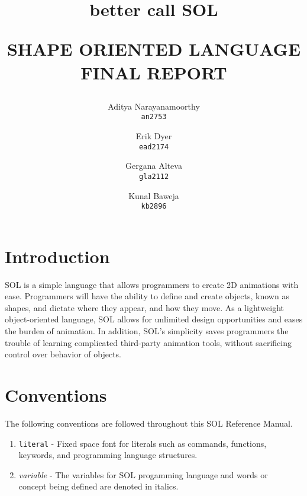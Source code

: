 \documentclass[letterpaper,12pt]{article}
\begin{document}

\title{{\small better call} {\Huge \textbf{SOL}}\\
    \begin{center}{SHAPE ORIENTED LANGUAGE FINAL REPORT}\end{center}
}

\author{Aditya Narayanamoorthy\\
    \texttt{an2753}
    \and
    Erik Dyer\\
    \texttt{ead2174}
    \and
    Gergana Alteva\\
    \texttt{gla2112}
    \and
    Kunal Baweja\\
    \texttt{kb2896}}

\maketitle

\tableofcontents

\section{Introduction}
SOL is a simple language that allows programmers to create 2D animations with ease. Programmers will have the ability to define and create objects, known as shapes, and dictate where they appear, and how they move. As a lightweight object-oriented language, SOL allows for unlimited design opportunities and eases the burden of animation. In addition, SOL’s simplicity saves programmers the trouble of learning complicated third-party animation tools, without sacrificing control over behavior of objects.
\par

\section{Conventions}
    The following conventions are followed throughout this SOL Reference Manual.

    \begin{enumerate}
        \itemsep0em
        \item \texttt{literal} - Fixed space font for literals such as commands, functions,\\
        \hspace*{4.4em} keywords, and programming language structures.
        
        \item \textit{variable} - The variables for SOL progamming language and words or\\
        \hspace*{4.4em} concept being defined are denoted in italics.
    \end{enumerate}
\end{document}
